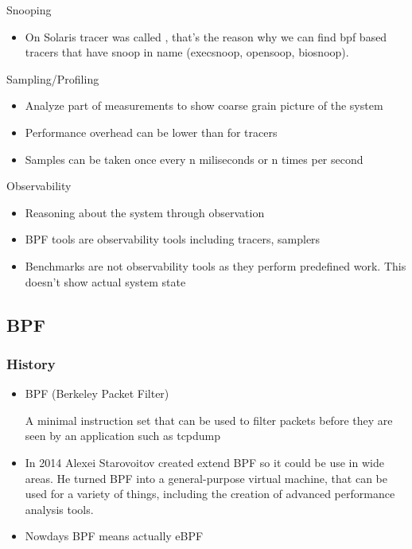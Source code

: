 \documentclass{beamer}
\begin{document}
\begin{frame}
  \begin{block}{Snooping}
    \begin{itemize}
      \item On Solaris tracer was called , that's the reason why we can find bpf based tracers that have snoop in name (execsnoop, opensoop, biosnoop).
    \end{itemize}
  \end{block}
\end{frame}


\begin{frame}
  \begin{block}{Sampling/Profiling}
    \begin{itemize}
      \item<1-> Analyze part of measurements to show coarse grain picture of the system
      \item<2-> Performance overhead can be lower than for tracers
      \item<3-> Samples can be taken once every n miliseconds or n times per second 
    \end{itemize}
  \end{block} 
\end{frame}


\begin{frame}
  \begin{block}{Observability}
    \begin{itemize}
      \item<1-> Reasoning about the system through observation
      \item<2-> BPF tools are observability tools including tracers, samplers
      \item<3-> Benchmarks are not observability tools as they perform predefined work. This doesn't show actual system state
    \end{itemize}
  \end{block} 
\end{frame}


\subsection{BPF} %

\begin{frame}
\frametitle{History}
\begin{itemize}
\item<1->
BPF (Berkeley Packet Filter)

A minimal instruction set that can be used to filter packets before they are seen by an application such
as tcpdump
\item<2->
In 2014 Alexei Starovoitov created extend BPF so it could be use in wide areas.
He turned BPF into a general-purpose virtual machine, that can be used for a variety of things,
including the creation of advanced performance analysis tools.
\item<3-> Nowdays BPF means actually eBPF
\end{itemize}
\end{frame}
\end{document}
